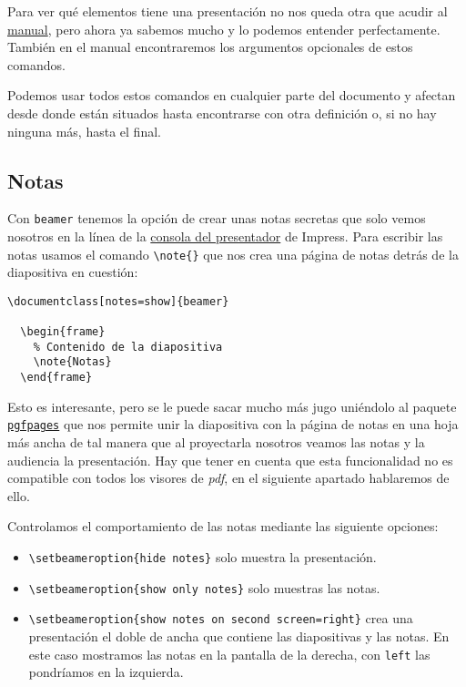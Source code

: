 Para ver qué elementos tiene una presentación no nos queda otra que
acudir al
\href{http://osl.ugr.es/CTAN/macros/latex/contrib/beamer/doc/beameruserguide.pdf}{manual},
pero ahora ya sabemos mucho y lo podemos entender perfectamente. También
en el manual encontraremos los argumentos opcionales de estos comandos.

Podemos usar todos estos comandos en cualquier parte del documento y
afectan desde donde están situados hasta encontrarse con otra definición
o, si no hay ninguna más, hasta el final.

\subsection{Notas}

Con \lstinline!beamer! tenemos la opción de crear unas notas secretas
que solo vemos nosotros en la línea de la
\href{https://wiki.openoffice.org/wiki/Presenter_Screen}{consola del
presentador} de Impress. Para escribir las notas usamos el comando
\lstinline!\note{}! que nos crea una página de notas detrás de la
diapositiva en cuestión:

\begin{lstlisting}[language={[latex]tex}]
\documentclass[notes=show]{beamer}

  \begin{frame}
    % Contenido de la diapositiva
    \note{Notas}
  \end{frame}

\end{lstlisting}

Esto es interesante, pero se le puede sacar mucho más jugo uniéndolo al
paquete \href{http://ctan.org/pkg/pgf}{\lstinline!pgfpages!} que nos
permite unir la diapositiva con la página de notas en una hoja más ancha
de tal manera que al proyectarla nosotros veamos las notas y la
audiencia la presentación. Hay que tener en cuenta que esta
funcionalidad no es compatible con todos los visores de \emph{pdf}, en
el siguiente apartado hablaremos de ello.

Controlamos el comportamiento de las notas mediante las siguiente
opciones:

\begin{itemize}
\item
  \lstinline!\setbeameroption{hide notes}! solo muestra la presentación.
\item
  \lstinline!\setbeameroption{show only notes}! solo muestras las notas.
\item
  \lstinline!\setbeameroption{show notes on second screen=right}! crea
  una presentación el doble de ancha que contiene las diapositivas y las
  notas. En este caso mostramos las notas en la pantalla de la derecha,
  con \lstinline!left! las pondríamos en la izquierda.
\end{itemize}

